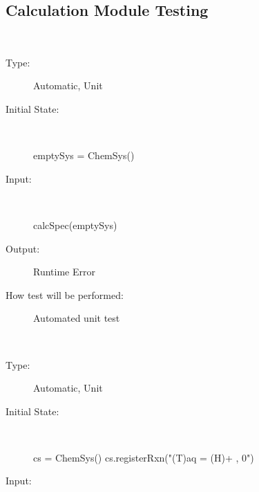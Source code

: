 \documentclass[12pt, titlepage]{article}
\newcounter{testnum} %
\begin{document}
\subsection{Calculation Module Testing}
\begin{addmargin}[2em]{0em}



\\
\begin{addmargin}[2em]{0em}
\begin{description}
\item[Type:] Automatic, Unit
					
\item[Initial State:] ~\newline

\begin{python}
emptySys = ChemSys()
\end{python}
					
\item[Input:] ~\newline

\begin{python}
calcSpec(emptySys) 
\end{python}
					
\item[Output:] Runtime Error
					
\item[How test will be performed:] Automated unit test\\
\end{description}
\end{addmargin}

\newpage
{}\\
\begin{addmargin}[2em]{0em}
\begin{description}
\item[Type:] Automatic, Unit
					
\item[Initial State:] ~\newline

\begin{python}
cs = ChemSys()
cs.registerRxn("(T)aq = (H)+ , 0")
\end{python}
					
\item[Input:] ~\newline


\end{description}
\end{addmargin}
\end{addmargin}
\end{document}
